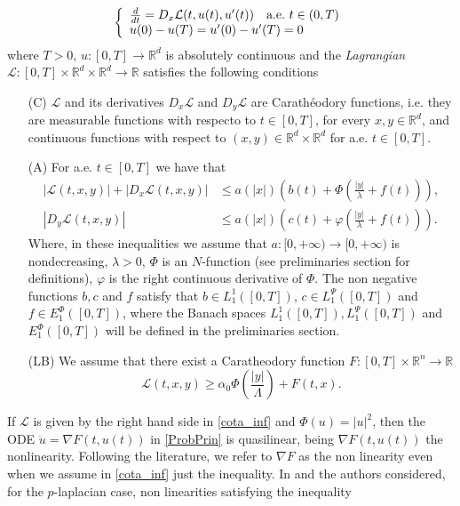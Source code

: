\documentclass[twoside]{article}
\theoremstyle{remark}
\newcommand{\lpsi}{L^{\Psi}}
\newcommand{\ephi}{E^{\Phi}}
\newcommand{\rr}{\mathbb{R}}
\renewcommand{\leq}{\leqslant}
\renewcommand{\geq}{\geqslant}
\begin{document}
\begin{equation}\label{ProbPrin}
    \left\{%
\begin{array}{ll}
   \frac{d}{dt} = D_{x}\mathcal{L}(t,u(t),u'(t)) \quad \hbox{a.e.}\ t \in (0,T)\\
    u(0)-u(T)=u'(0)-u'(T)=0
\end{array}%
\right.
\end{equation}
where $T>0$, $u:[0,T]\to\rr^d$ is absolutely continuous and the \emph{Lagrangian} $\mathcal{L}:[0,T]\times\rr^d\times\rr^d\to\rr$ satisfies the following conditions
\begin{enumerate}
 \item[(C)] $\mathcal{L}$ and its derivatives $D_x\mathcal{L}$  and $ D_y\mathcal{L}$  are  Carath\'eodory functions, i.e. they are measurable functions with respecto to $t\in [0,T]$, for every  $x,y\in\rr^d$, and   continuous functions with  respect to  $(x,y)\in\rr^d\times \rr^d$ for a.e. $t \in [0,T]$.

 \item[(A)]   For   a.e. $t\in [0,T]$ we have that
\begin{align*}
|\mathcal{L}(t,x,y)| + |D_{x}\mathcal{L}(t,x,y)|  &   \leq a(|x|)\left(b(t)+ \Phi\left(\frac{|y|}{\lambda}+f(t) \right)\right), \tag{A1}\label{cotaL}\\
|D_{y}\mathcal{L}(t,x,y)| &\leq a(|x|)\left(c(t)+ \varphi\left(\frac{|y|}{\lambda}+f(t)\right)  \right).\tag{A2}\label{cotaDyL}
\end{align*}
Where, in these inequalities we assume that  $a:[0,+\infty)\to [0,+\infty)$ is nondecreasing, $\lambda>0$, $\Phi$ is an $N$-function (see preliminaries section  for definitions), $\varphi$ is the right continuous derivative of $\Phi$. The non negative functions $b,c$ and $f$ satisfy that  $b\in L^1_1([0,T]) $,  $c\in\lpsi_1([0,T])$ and  $f\in \ephi_1([0,T])$, where  the Banach spaces $ L^1_1([0,T]), \lpsi_1([0,T])$ and  $\ephi_1([0,T])$  will be defined in the preliminaries section.



\item[(LB)] We assume that there exist a Caratheodory function $F:[0,T]\times\rr^n\to\rr$
\begin{equation}\label{cota_inf}
\mathcal{L}(t,x,y)\geq \alpha_0\Phi\left(\frac{|y|}{\Lambda}\right)+ F(t,x).
\end{equation}
\end{enumerate}




If $\mathcal{L}$ is given by the right hand side in \eqref{cota_inf} and $\Phi(u)=|u|^2$, then the ODE $\ddot{u}=\nabla F(t,u(t))$ in \eqref{ProbPrin}  is quasilinear,  being  $\nabla F(t,u(t))$ the nonlinearity. Following the literature, we refer to $\nabla F$ as the non linearity even when we assume in \eqref{cota_inf} just the inequality. In \cite{tang1998periodic} and \cite{tang2010periodic} the authors considered, for the $p$-laplacian case, non linearities satisfying the inequality
\end{document}
